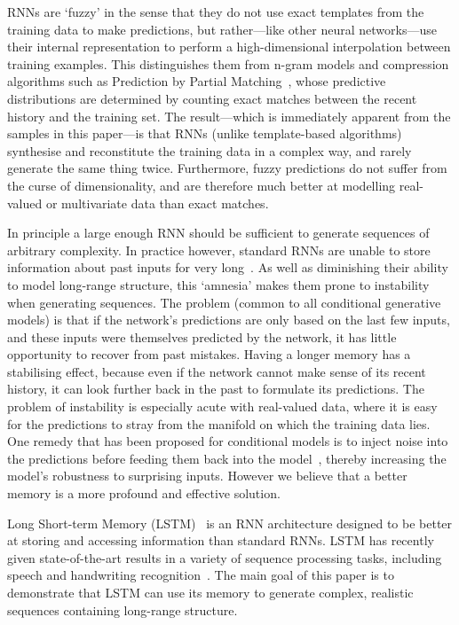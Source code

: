 \documentclass{article}
\begin{document}
RNNs are `fuzzy' in the sense that they do not use exact templates from the training data to make predictions, but rather---like other neural networks---use their internal representation to perform a high-dimensional interpolation between training examples.
This distinguishes them from n-gram models and compression algorithms such as Prediction by Partial Matching~\cite{cleary84ppm}, whose predictive distributions are determined by counting exact matches between the recent history and the training set.
The result---which is immediately apparent from the samples in this paper---is that RNNs (unlike template-based algorithms) synthesise and reconstitute the training data in a complex way, and rarely generate the same thing twice.
Furthermore, fuzzy predictions do not suffer from the curse of dimensionality, and are therefore much better at modelling real-valued or multivariate data than exact matches.


In principle a large enough RNN should be sufficient to generate sequences of arbitrary complexity.
In practice however, standard RNNs are unable to store information about past inputs for very long~\cite{hochreiter01book}.
As well as diminishing their ability to model long-range structure, this `amnesia' makes them prone to instability when generating sequences.
The problem (common to all conditional generative models) is that if the network's predictions are only based on the last few inputs, and these inputs were themselves predicted by the network, it has little opportunity to recover from past mistakes.
Having a longer memory has a stabilising effect, because even if the network cannot make sense of its recent history, it can look further back in the past to formulate its predictions.
The problem of instability is especially acute with real-valued data, where it is easy for the predictions to stray from the manifold on which the training data lies.
One remedy that has been proposed for conditional models is to inject noise into the predictions before feeding them back into the model~\cite{taylor09gait}, thereby increasing the model's robustness to surprising inputs.
However we believe that a better memory is a more profound and effective solution.

Long Short-term Memory (LSTM)~\cite{hochreiter97lstm} is an RNN architecture designed to be better at storing and accessing information than standard RNNs.
LSTM has recently given state-of-the-art results in a variety of sequence processing tasks, including speech and handwriting recognition~\cite{graves13icassp,graves09nips}.
The main goal of this paper is to demonstrate that LSTM can use its memory to generate complex, realistic sequences containing long-range structure.
\end{document}
